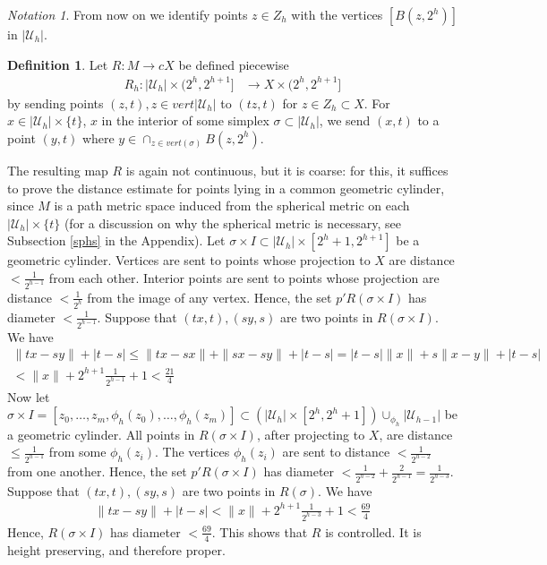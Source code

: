 \documentclass[a4paper,11pt]{article}
\theoremstyle{definition}
\newtheorem{definition}{Definition}[section]
\theoremstyle{plain}
\theoremstyle{remark}
\newtheorem*{notation}{Notation}
\begin{document}
{\begin{notation} From now on we identify points $z\in Z_{h}$ with the vertices $[B(z,2^h)]$ in $|\mathcal{U}_{h}|$.
\end{notation}
\begin{definition}\label{R}Let $R: M\rightarrow cX$ be defined piecewise 
\begin{align*}
R_{h}:|\mathcal{U}_{h}| \times (2^{h},2^{h+1}] &\rightarrow X \times (2^{h},2^{h+1}]
\end{align*}
by sending points $(z,t), z\in vert |\mathcal{U}_{h}|$ to $(tz,t)$ for $z\in Z_{h} \subset X$. For $x\in |\mathcal{U}_{h}| \times \{t\}$, $x$ in the interior of some simplex $\sigma\subset |\mathcal{U}_{h}|$, we send $(x,t)$ to a point $(y,t)$ where $y\in \cap_{z\in vert(\sigma)}B(z,2^h)$. 
\end{definition}

The resulting map $R$  is again not continuous, but it is coarse: for this, it suffices to prove the distance estimate for points lying in a common geometric cylinder, since $M$ is a path metric space induced from the spherical metric on each $|\mathcal{U}_{h}| \times \{t\}$ (for a discussion on why the spherical metric is necessary, see Subsection \ref{sphs} in the Appendix). Let $\sigma \times I \subset |\mathcal{U}_{h}| \times [2^{h}+1,2^{h+1}]$ be a geometric cylinder. Vertices are sent to points whose projection to $X$ are distance $<\frac{1}{2^{h-1}}$ from each other. Interior points are sent to points whose projection are distance $< \frac{1}{2^{h}}$ from the image of any vertex. Hence, the set $p'R(\sigma \times I)$ has diameter $<\frac{1}{2^{h-1}}$. Suppose that $(tx,t),(sy,s)$ are two points in $R(\sigma \times I)$. We have
\begin{align*}
\|tx-sy\| +|t-s| \leq \|tx-sx\| +\|sx-sy\| +|t-s| =|t-s|\|x\| +s \|x-y\| +|t-s|\\
 < \|x\| + 2^{h+1} \frac{1}{2^{h-1}} + 1 < \frac{21}{4} 
\end{align*} 
Now let $\sigma \times I = [z_0,\dots,z_m, \phi_{h}(z_0), \dots, \phi_{h}(z_m)] \subset (|\mathcal{U}_{h}| \times [2^{h},2^{h}+1]) \cup_{\phi_h} |\mathcal{U}_{h-1}|$ be a geometric cylinder.  All points in $R(\sigma \times I)$, after projecting to $X$, are distance  $\leq \frac{1}{2^{h-1}}$ from some $\phi_{h}(z_i)$. The vertices  $\phi_{h}(z_i)$ are sent to distance $< \frac{1}{2^{h-2}}$ from one another. Hence, the set $p'R(\sigma \times I)$ has diameter $<\frac{1}{2^{h-2}} + \frac{2}{2^{h-1}} = \frac{1}{2^{h-3}}$. Suppose that $(tx,t),(sy,s)$ are two points in $R(\sigma)$. We have
 \begin{align*}
\|tx-sy\| +|t-s| <  \|x\| + 2^{h+1} \frac{1}{2^{h-3}} + 1 < \frac{69}{4} 
\end{align*} 
Hence, $R(\sigma \times I)$ has diameter $< \frac{69}{4}$. This shows that $R$ is controlled. It is height preserving, and therefore proper.\\


}
\end{document}
